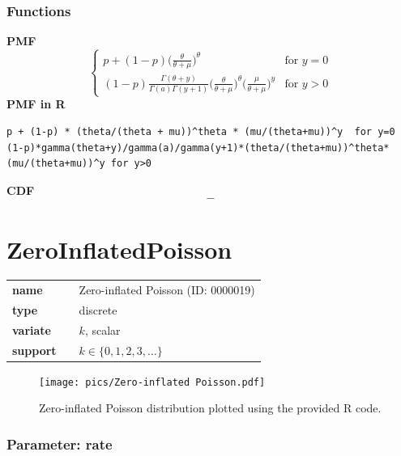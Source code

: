 \documentclass{article}
\begin{document}
\subsubsection*{Functions}

\smallskip \noindent \hspace{.2cm} \textbf{PMF} 
\begin{equation*}\begin{cases}
p + (1-p) \Big(\frac{\theta}{\theta + \mu} \Big)^{\theta} & \text{for } y = 0 \\ 
(1-p) \frac{\Gamma(\theta + y)}{\Gamma(a)\Gamma(y+1)} \Big(\frac{\theta}{\theta + \mu} \Big)^{\theta} 
\Big(\frac{\mu}{\theta + \mu} \Big)^{y} & \text{for } y > 0
\end{cases}\end{equation*}
\smallskip \noindent \hspace{.2cm} \textbf{PMF in R}  
\begin{verbatim}p + (1-p) * (theta/(theta + mu))^theta * (mu/(theta+mu))^y  for y=0
(1-p)*gamma(theta+y)/gamma(a)/gamma(y+1)*(theta/(theta+mu))^theta*(mu/(theta+mu))^y for y>0\end{verbatim}
\smallskip \noindent \hspace{.2cm} \textbf{CDF} 
\begin{equation*}-\end{equation*}
\smallskip\section*{ZeroInflatedPoisson} 

  \bigskip 

\begin{tabular}{p{2cm}cl}
\textbf{name} & & Zero-inflated Poisson (ID: 0000019)\\ 
 
\textbf{type} & & discrete \\ 

\textbf{variate} & & $k$, scalar \\ 

\textbf{support} & & $k \in \{0,1,2,3,\dots\}$
\end{tabular}

\begin{figure}[ht!]
\centering
  \texttt{[image: pics/Zero-inflated Poisson.pdf]}
 \caption{Zero-inflated Poisson distribution plotted using the provided R code.}
 \label{fig:Zero-inflated Poisson}
\end{figure}

\subsubsection*{Parameter: rate}
\end{document}
